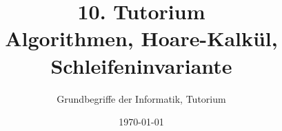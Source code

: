





\title[Algorithmen]{10. Tutorium\\ Algorithmen, Hoare-Kalkül, Schleifeninvariante}
\subtitle{Grundbegriffe der Informatik, Tutorium \hashtag\mytutnumber}
\date{\today}


\titleframe
\roadmap




\section{}
\questionframe
\lastframe
{}
